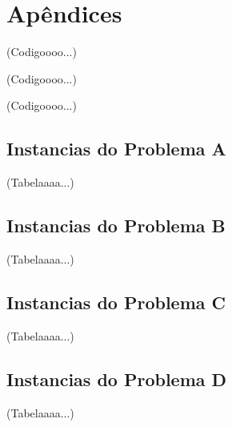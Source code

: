 \chapter{Apêndices}

\appendix

\label{apd:fun-gen-init-pop}
    (Codigoooo...)

\label{apd:pso-class}

\label{apd:particule-class}

\label{apd:decode-class}
    (Codigoooo...)

\label{apd:encode-class}
    (Codigoooo...)

\label{apd:problem-instances}

\section{Instancias do Problema A}
\label{apd:problem-instance-a}
    (Tabelaaaa...)
\section{Instancias do Problema B}
\label{apd:problem-instance-b}
    (Tabelaaaa...)
\section{Instancias do Problema C}
\label{apd:problem-instance-c}
    (Tabelaaaa...)
\section{Instancias do Problema D}
\label{apd:problem-instance-d}
    (Tabelaaaa...)



